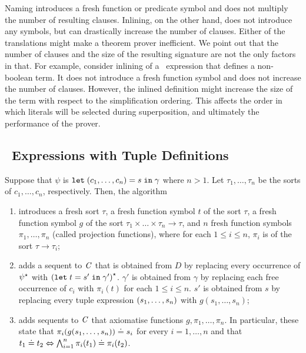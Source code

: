 Naming introduces a fresh function or predicate symbol and does not multiply the number of resulting clauses. Inlining, on the other hand, does not introduce any symbols, but can drastically increase the number of clauses. Either of the translations might make a theorem prover inefficient. We point out that the number of clauses and the size of the resulting signature are not the only factors in that. For example, consider inlining of a \LETIN\ expression that defines a non-boolean term. It does not introduce a fresh function symbol and does not increase the number of clauses. However, the inlined definition might increase the size of the term with respect to the simplification ordering. This affects the order in which literals will be selected during superposition, and ultimately the performance of the prover.


\subsection*{\LETIN\ Expressions with Tuple Definitions}
Suppose that $\psi$ is $\mathtt{let}\;{({c_1,\ldots,c_n})}={s}\;\allowbreak\mathtt{in}\;{\gamma}$ where $n > 1$. Let $\tau_1,\ldots,\tau_n$ be the sorts of $c_1,\ldots,c_n$, respectively. Then, 
the \nfcnf{} algorithm 
\begin{enumerate}
  \item introduces a fresh sort $\tau$, a fresh function symbol $t$ of the sort $\tau$, a fresh function symbol $g$ of the sort $\tau_1\times\ldots\times\tau_n\to\tau$, and $n$ fresh function symbols $\pi_1,\ldots,\pi_n$ (called projection functions), where for each $1 \le i \le n$, $\pi_i$ is of the sort $\tau \to \tau_i$;
  \item adds a sequent to $\mathit{C}$ that is obtained from $D$ by replacing every occurrence of ${\psi}^{\star}$ with ${(\mathtt{let}\;{t}={s'}\;\allowbreak\mathtt{in}\;{\gamma'})}^{\star}$. $\gamma'$ is obtained from $\gamma$ by replacing each free occurrence of $c_i$ with $\pi_i(t)$ for each $1 \le i \le n$. $s'$ is obtained from $s$ by replacing every tuple expression $({s_1,\ldots,s_n})$ with $g(s_1,\ldots,s_n)$;
  \item adds sequents to $\mathit{C}$ that axiomatise functions $g,\pi_1,\ldots,\pi_n$. In particular, these state
  that $\pi_i(g(s_1,\ldots,s_n)) \doteq s_i$ for every $i=1,\ldots, n$ and that $t_1 \doteq t_2 \Leftrightarrow \bigwedge_{i=1}^n \pi_i(t_1) \doteq \pi_i(t_2)$.
\end{enumerate} 

